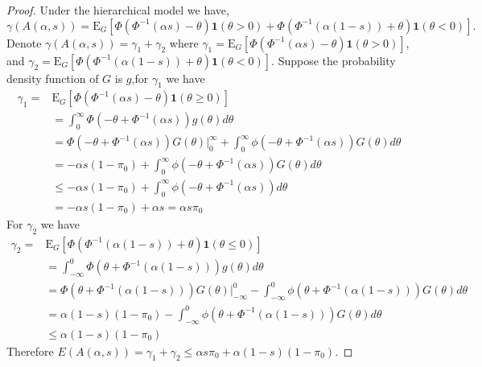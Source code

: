 \documentclass[11pt]{article}
\begin{document}
\begin{proof} Under the hierarchical model we have, 
	\begin{equation*}
		\gamma(A(\alpha,s)) = \text{E}_G[\Phi(\Phi^{-1}(\alpha s) - \theta)\textbf{1}(\theta > 0) + \Phi(\Phi^{-1}(\alpha (1-s)) + \theta)\textbf{1}(\theta < 0)]. 
	\end{equation*}
	Denote $\gamma(A(\alpha,s)) = \gamma_1 + \gamma_2$ where $
		\gamma_1 =  \text{E}_G[\Phi(\Phi^{-1}(\alpha s) - \theta)\textbf{1}(\theta > 0)]$, and $
		\gamma_2 =  \text{E}_G[\Phi(\Phi^{-1}(\alpha (1-s)) + \theta)\textbf{1}(\theta < 0)]$. 
	Suppose the probability density function of $G$ is $g$,for $\gamma_1$ we have
	\begin{equation}
		\begin{split}
			\gamma_1 = & \text{E}_G[\Phi(\Phi^{-1}(\alpha s) - \theta)\textbf{1}(\theta \geq 0)] \\
			& = \int_{0}^{\infty} \Phi(-\theta + \Phi^{-1}(\alpha s)) g(\theta) d\theta \\
			& = \Phi(-\theta + \Phi^{-1}(\alpha s))G(\theta) |^{\infty}_{0} + \int_{0}^{\infty} \phi(-\theta + \Phi^{-1}(\alpha s)) G(\theta)d\theta \\
			& = -\alpha s (1-\pi_0)  + \int_{0}^{\infty} \phi(-\theta + \Phi^{-1}(\alpha s)) G(\theta)d\theta \\
			& \leq -\alpha s (1-\pi_0) + \int_{0}^{\infty} \phi(-\theta + \Phi^{-1}(\alpha s)) d\theta \\
			& = -\alpha s (1-\pi_0)  + \alpha s = \alpha s \pi_0
		\end{split}
	\end{equation}
	For $\gamma_2$ we have
	\begin{equation}
		\begin{split}
			\gamma_2 = & \text{E}_G[\Phi(\Phi^{-1}(\alpha (1-s)) + \theta)\textbf{1}(\theta \leq 0)] \\
			& = \int_{-\infty}^0 \Phi(\theta + \Phi^{-1}(\alpha 
			(1- s)) )g(\theta) d\theta \\
			& = \Phi(\theta + \Phi^{-1}(\alpha (1- s)))G(\theta) |_{-\infty}^{0} -\int^{0}_{-\infty} \phi(\theta + \Phi^{-1}(\alpha (1- s))) G(\theta)d\theta \\
			& = \alpha (1- s)(1-\pi_0)  -\int^{0}_{-\infty} \phi(\theta + \Phi^{-1}(\alpha (1- s))) G(\theta)d\theta \\
			&\leq \alpha (1- s)(1-\pi_0) 
		\end{split}
	\end{equation}
	Therefore $E(A(\alpha,s)) = \gamma_1 + \gamma_2 \leq \alpha s \pi_0 +\alpha (1-s) (1-\pi_0)$.
\end{proof}
\end{document}
